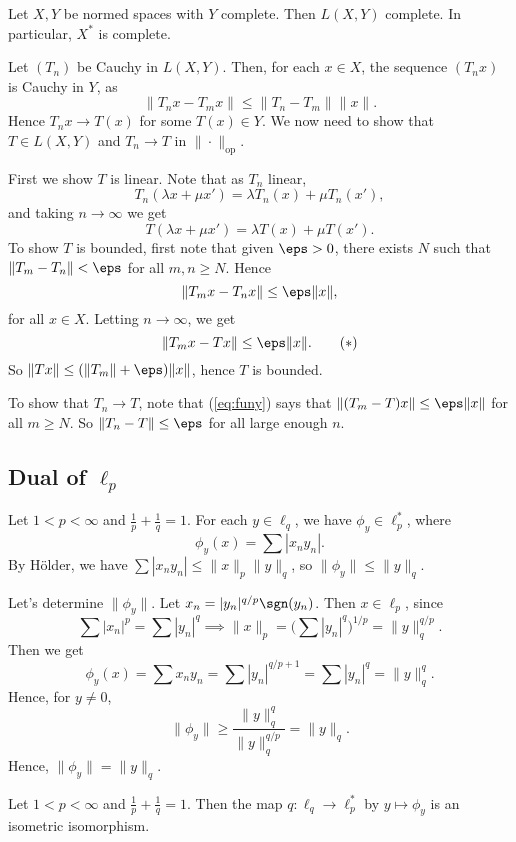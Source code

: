 \documentclass[12pt]{article}
\begin{document}
\begin{theorem}
	Let $X, Y$ be normed spaces with $Y$ complete. Then $L(X, Y)$ complete. In particular, $X^{\ast}$ is complete.
\end{theorem}

\begin{proofbox}
	Let $(T_n)$ be Cauchy in $L(X, Y)$. Then, for each $x \in X$, the sequence $(T_n x)$ is Cauchy in $Y$, as
	\[
	\|T_n x - T_m x\| \leq \|T_n - T_m\| \|x\|.
	\]
	Hence $T_n x \to T(x)$ for some $T(x) \in Y$. We now need to show that $T \in L(X, Y)$ and $T_n \to T$ in $\|\cdot\|_\mathrm{op}$.

	First we show $T$ is linear. Note that as $T_n$ linear,
	\[
	T_n(\lambda x + \mu x') = \lambda T_n(x) + \mu T_n(x'),
	\]
	and taking $n \to \infty$ we get
	\[
	T(\lambda x + \mu x') = \lambda T(x) + \mu T(x').
	\]
	To show $T$ is bounded, first note that given $\eps > 0$, there exists $N$ such that $\|T_m - T_n\| < \eps$ for all $m, n \geq N$. Hence
	\[
	\|T_m x - T_n x\| \leq \eps \|x\|,
	\]
	for all $x \in X$. Letting $n \to \infty$, we get
	\[
		\|T_m x - T x\| \leq \eps \|x\|. \tag{$\ast$}\label{eq:funy}
	\]
	So $\|Tx\| \leq (\|T_m\| + \eps)\|x\|$, hence $T$ is bounded.

	To show that $T_n \to T$, note that (\ref{eq:funy}) says that $\|(T_m - T)x\| \leq \eps\|x\|$ for all $m \geq N$. So $\|T_n - T\| \leq \eps$ for all large enough $n$.
\end{proofbox}

\subsection{\texorpdfstring{Dual of $\ell_p$ }{Dual of l_p}}
\label{sub:dual_lp}

Let $1 < p < \infty$ and $\frac{1}{p} + \frac{1}{q} = 1$. For each $y \in \ell_q$, we have $\phi_y \in \ell_p^{\ast}$, where
\[
\phi_y(x) = \sum |x_n y_n|.
\]
By H\"{o}lder, we have $\sum |x_n y_n| \leq \|x\|_p \|y\|_q$, so $\|\phi_y\| \leq \|y\|_q$.

Let's determine $\|\phi_y\|$. Let $x_n = |y_n|^{q/p}\sgn(y_n)$. Then $x \in \ell_p$, since
\[
\sum |x_n|^{p} = \sum |y_n|^q \implies \|x\|_p = \Biggl( \sum |y_n|^q \Biggr)^{1/p} = \|y\|_q^{q/p}.
\]
Then we get
\[
\phi_y(x) = \sum x_n y_n = \sum |y_n|^{q/p+1} = \sum |y_n|^{q} = \|y\|_q^{q}.
\]
Hence, for $y \neq 0$,
\[
\|\phi_y\| \geq \frac{\|y\|_q^{q}}{\|y\|_q^{q/p}} = \|y\|_q.
\]
Hence, $\|\phi_y\| = \|y\|_q$.

\begin{theorem}
	Let $1 < p < \infty$ and $\frac{1}{p} + \frac{1}{q} = 1$. Then the map $q : \ell_q \to \ell_p^{\ast}$ by $y \mapsto \phi_y$ is an isometric isomorphism.
\end{theorem}
\end{document}
